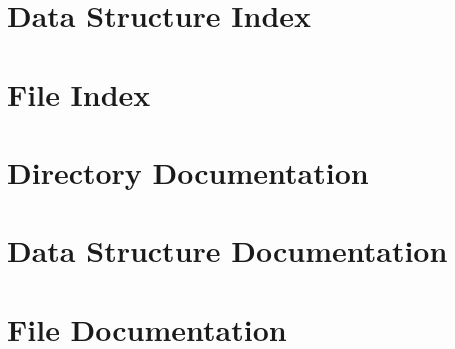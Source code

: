 \documentclass[a4paper]{book}
\begin{document}
\chapter{Data Structure Index}

\chapter{File Index}

\chapter{Directory Documentation}

\chapter{Data Structure Documentation}














\chapter{File Documentation}
































\printindex
\end{document}
